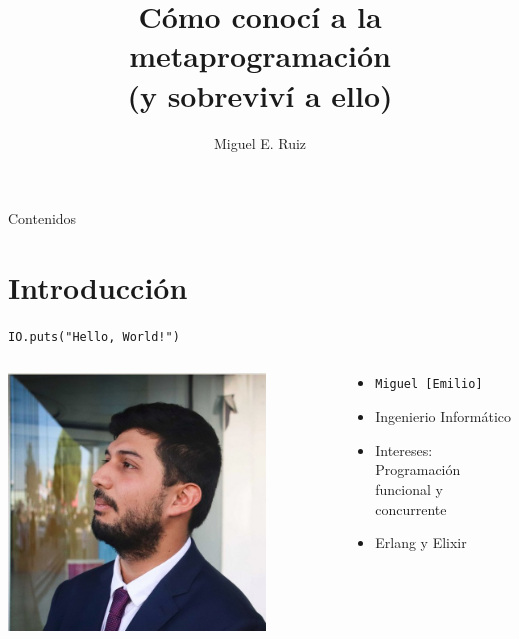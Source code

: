 \documentclass[14pt,aspectratio=169]{beamer}
\author[Miguel E. Ruiz]{Miguel E. Ruiz}
\title[\texttt{Madrid |> Elixir}]{Cómo conocí a la metaprogramación\\ (y sobreviví a ello)}
\date{\mydate}
\begin{document}
\begin{frame}
  \titlepage
\end{frame}

\begin{frame}{Contenidos}
  \tableofcontents[hideallsubsections]
\end{frame}

\section{Introducción}
\begin{frame}{\texttt{IO.puts("Hello, World!")}}
  \begin{columns}
    \begin{column}{0.5\textwidth}
      \centering
      \includegraphics[width=0.8\textwidth]{me-formal.jpg}
    \end{column}

    \begin{column}{0.5\textwidth}
      \begin{itemize}
        \item \texttt{Miguel [Emilio]}
        \item Ingenierio Informático
        \item Intereses: Programación funcional y concurrente
        \item Erlang y Elixir
      \end{itemize}
    \end{column}
  \end{columns}
\end{frame}
\end{document}
